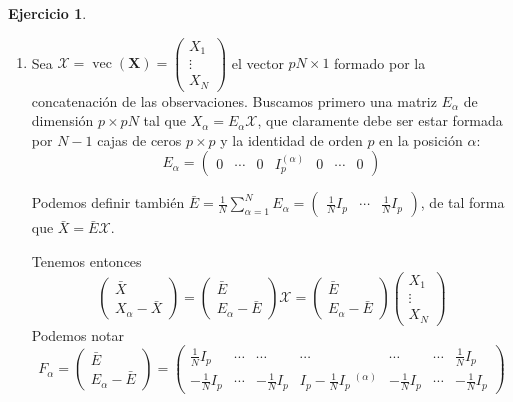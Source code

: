 \documentclass[12pt,spanish]{article}
\theoremstyle{definition}
\newtheorem{exercise}{Ejercicio}
\begin{document}
\begin{exercise} ~ %
  \begin{enumerate}[$a)$]
  \item Sea $\mathcal{X}=\operatorname{vec}(\textbf{X})=
    \begin{pmatrix}
      X_1 \\ \vdots \\ X_N
    \end{pmatrix}
    $ el vector $pN\times 1$ formado por la concatenación de las
    observaciones. Buscamos primero una matriz $E_\alpha$ de dimensión
    $p\times pN$ tal que $X_\alpha=E_\alpha\mathcal{X}$, que claramente debe ser estar formada por $N-1$ cajas de ceros $p\times p$ y la identidad de orden $p$ en la posición $\alpha$: \[E_\alpha=
    \begin{pmatrix}
      0 & \cdots & 0 & I_p^{(\alpha)} & 0 & \cdots & 0
    \end{pmatrix}\]

  Podemos definir también
  $\bar{E}=\frac{1}{N}\sum\limits_{\alpha=1}^{N} E_\alpha= \begin{pmatrix}
        \frac{1}{N}I_p & \cdots & \frac{1}{N}I_p
      \end{pmatrix}$, de tal forma que $\bar{X}=\bar{E}\mathcal{X}$.

  Tenemos entonces \[
    \begin{pmatrix}
      \bar{X} \\ X_\alpha-\bar{X}
    \end{pmatrix}=
    \begin{pmatrix}
        \bar{E} \\ E_\alpha-\bar{E}
      \end{pmatrix}\mathcal{X}=
    \begin{pmatrix}
        \bar{E} \\ E_\alpha-\bar{E}
      \end{pmatrix}\begin{pmatrix}
      X_1 \\ \vdots \\ X_N
    \end{pmatrix}
  \]
  Podemos notar
  \[F_\alpha=\begin{pmatrix}
        \bar{E} \\ E_\alpha-\bar{E}
      \end{pmatrix}=
      \begin{pmatrix}
        \frac{1}{N}I_p & \cdots & \cdots & \cdots & \cdots & \cdots & \frac{1}{N}I_p \\
        -\frac{1}{N}I_p & \cdots & -\frac{1}{N}I_p & I_p-\frac{1}{N}I_p~^{(\alpha)}& -\frac{1}{N}I_p & \cdots & -\frac{1}{N}I_p
      \end{pmatrix}
    \]


\end{enumerate}
\end{exercise}
\end{document}
